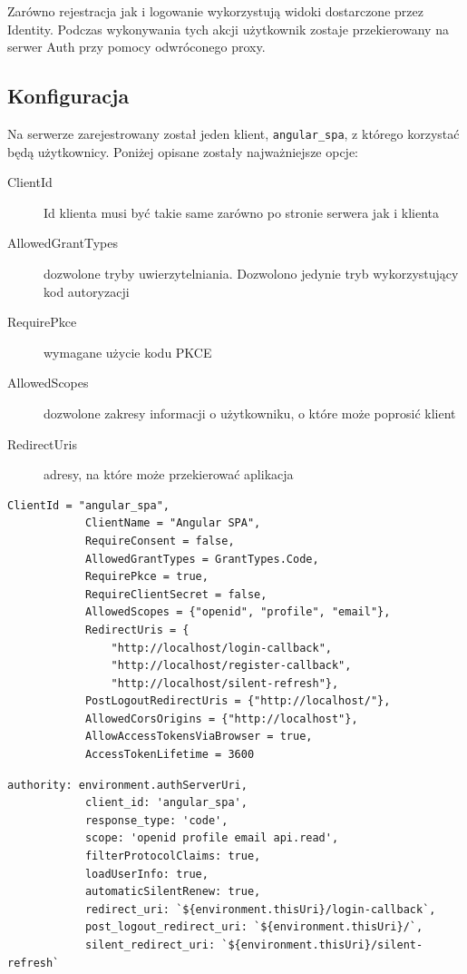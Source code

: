 	Zarówno rejestracja jak i logowanie wykorzystują widoki dostarczone przez Identity.
	Podczas wykonywania tych akcji użytkownik zostaje przekierowany na serwer Auth przy pomocy odwróconego proxy.

	\subsection{Konfiguracja}
		Na serwerze zarejestrowany został jeden klient, \verb|angular_spa|, z którego korzystać będą użytkownicy.
		Poniżej opisane zostały najważniejsze opcje:
		\begin{description}
			\item[ClientId] Id klienta musi być takie same zarówno po stronie serwera jak i klienta
			\item[AllowedGrantTypes] dozwolone tryby uwierzytelniania. Dozwolono jedynie tryb wykorzystujący kod autoryzacji
			\item[RequirePkce] wymagane użycie kodu PKCE
			\item[AllowedScopes] dozwolone zakresy informacji o użytkowniku, o które może poprosić klient
			\item[RedirectUris] adresy, na które może przekierować aplikacja
		\end{description}
		\begin{lstlisting}[label=lst:openIdSrv, caption=Konfiguracja OpenId po stronie serwera, float]
			ClientId = "angular_spa",
			ClientName = "Angular SPA",
			RequireConsent = false,
			AllowedGrantTypes = GrantTypes.Code,
			RequirePkce = true,
			RequireClientSecret = false,
			AllowedScopes = {"openid", "profile", "email"},
			RedirectUris = {
				"http://localhost/login-callback",
				"http://localhost/register-callback",
				"http://localhost/silent-refresh"},
			PostLogoutRedirectUris = {"http://localhost/"},
			AllowedCorsOrigins = {"http://localhost"},
			AllowAccessTokensViaBrowser = true,
			AccessTokenLifetime = 3600
		\end{lstlisting}

		\begin{lstlisting}[label=lst:openIdSpa, caption=Konfiguracja OpenId po stronie Spa, float]
			authority: environment.authServerUri,
			client_id: 'angular_spa',
			response_type: 'code',
			scope: 'openid profile email api.read',
			filterProtocolClaims: true,
			loadUserInfo: true,
			automaticSilentRenew: true,
			redirect_uri: `${environment.thisUri}/login-callback`,
			post_logout_redirect_uri: `${environment.thisUri}/`,
			silent_redirect_uri: `${environment.thisUri}/silent-refresh`
		\end{lstlisting}


